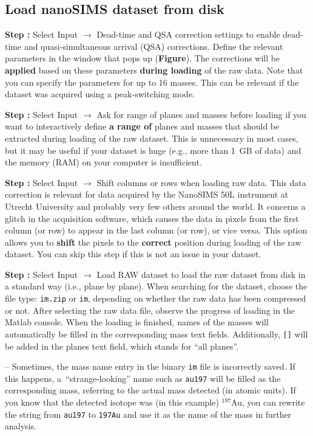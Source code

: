 \documentclass[a4paper, 11pt]{article}
\newcommand{\ttt}[1]{\texttt{#1}}
\newcommand{\lans}[1]{{\color{magenta}#1}}
\newcommand{\lanstf}[1]{{\color{cyan}#1}}
\newcommand\ra{\rightarrow}
\newcommand\addon[1]{-- {\small #1}}
\newcommand\figref[0]{\textbf{Figure}}
\newcounter{step}
\newcommand\s{\addtocounter{step}{1}\noindent\textbf{Step \thestep:}{ }}
\newcommand\bb[1]{\textbf{#1}}
\begin{document}
\addtolength{\parskip}{2mm}

\subsection{Load nanoSIMS dataset from disk}

\s Select \lans{Input} $\ra$ \lans{Dead-time and QSA correction settings} to enable dead-time and quasi-simul\-ta\-neous arrival (QSA) corrections. Define the relevant parameters in the window that pops up (\figref). The corrections will be \bb{applied} based on these parameters \bb{during loading} of the raw data. Note that you can specify the parameters for up to 16 masses. This can be relevant if the dataset was acquired using a peak-switching mode.

\s Select \lans{Input} $\ra$ \lans{Ask for range of planes and masses before loading} if you want to interactively define \bb{a range of} planes and masses that should be extracted during loading of the raw dataset. This is unnecessary in most cases, but it may be useful if your dataset is huge (e.g., more than 1~GB of data) and the memory (RAM) on your computer is insufficient.

\s Select \lans{Input} $\ra$ \lans{Shift columns or rows when loading raw data}. This data correction is relevant for data acquired by the NanoSIMS 50L instrument at Utrecht University and probably very few others around the world. It concerns a glitch in the acquisition software, which causes the data in pixels from the first column (or row) to appear in the last column (or row), or vice versa. This option allows you to \bb{shift} the pixels to the \bb{correct} position during loading of the raw dataset. You can skip this step if this is not an issue in your dataset.

\s Select \lans{Input} $\ra$ \lans{Load RAW dataset} to load the raw dataset from disk in a standard way (i.e., plane by plane). When searching for the dataset, choose the file type: \ttt{im.zip} or \ttt{im}, depending on whether the raw data has been compressed or not. After selecting the raw data file, observe the progress of loading in the Matlab console. When the loading is finished, names of the masses will automatically be filled in the corresponding \lanstf{mass} text fields. Additionally, \ttt{[]} will be added in the \lanstf{planes} text field, which stands for ``all planes''.

\addon{Sometimes, the mass name entry in the binary \ttt{im} file is incorrectly saved. If this happens, a~``strange-looking'' name such as \ttt{au197} will be filled as the corresponding \lanstf{mass}, referring to the actual mass detected (in atomic units). If you know that the detected isotope was (in this example) ${}^{197}$Au, you can rewrite the string from \ttt{au197} to \ttt{197Au} and use it as the name of the mass in further analysis.}
\end{document}
